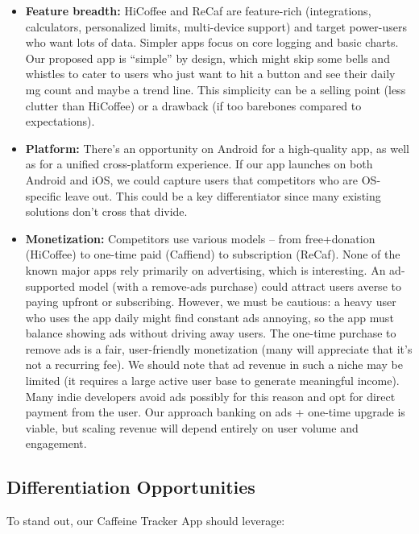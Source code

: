 \documentclass{article}
\begin{document}
\begin{itemize}
    \item \textbf{Feature breadth:} HiCoffee and ReCaf are feature-rich (integrations, calculators, personalized limits, multi-device support) and target power-users who want lots of data. Simpler apps focus on core logging and basic charts. Our proposed app is “simple” by design, which might skip some bells and whistles to cater to users who just want to hit a button and see their daily mg count and maybe a trend line. This simplicity can be a selling point (less clutter than HiCoffee) or a drawback (if too barebones compared to expectations).
    \item \textbf{Platform:} There’s an opportunity on Android for a high-quality app, as well as for a unified cross-platform experience. If our app launches on both Android and iOS, we could capture users that competitors who are OS-specific leave out. This could be a key differentiator since many existing solutions don’t cross that divide.
    \item \textbf{Monetization:} Competitors use various models – from free+donation (HiCoffee) to one-time paid (Caffiend) to subscription (ReCaf). None of the known major apps rely primarily on advertising, which is interesting. An ad-supported model (with a remove-ads purchase) could attract users averse to paying upfront or subscribing. However, we must be cautious: a heavy user who uses the app daily might find constant ads annoying, so the app must balance showing ads without driving away users. The one-time purchase to remove ads is a fair, user-friendly monetization (many will appreciate that it’s not a recurring fee). We should note that ad revenue in such a niche may be limited (it requires a large active user base to generate meaningful income). Many indie developers avoid ads possibly for this reason and opt for direct payment from the user. Our approach banking on ads + one-time upgrade is viable, but scaling revenue will depend entirely on user volume and engagement.
\end{itemize}

\subsection{Differentiation Opportunities}
To stand out, our Caffeine Tracker App should leverage:
\end{document}

